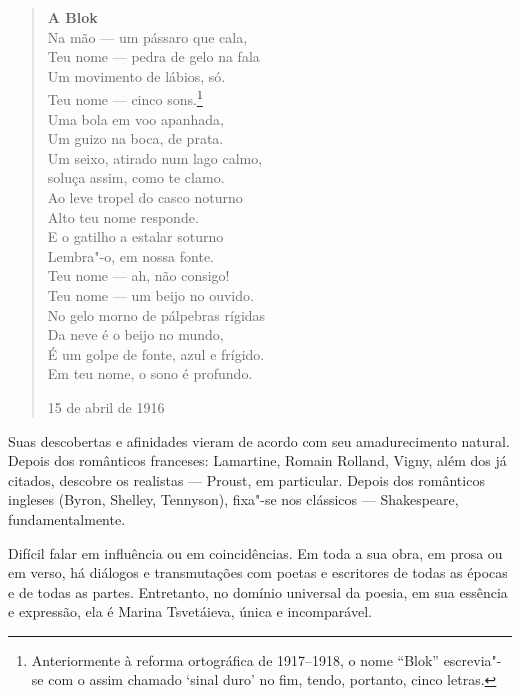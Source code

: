 \begin{verse}
\textbf{A Blok} \\[8pt]
Na mão --- um pássaro que cala, \\
Teu nome --- pedra de gelo na fala \\
Um movimento de lábios, só. \\
Teu nome --- cinco sons.\footnote{Anteriormente à reforma ortográfica de 1917--1918, o nome ``Blok'' escrevia"-se com o assim chamado `sinal duro' no fim, tendo, portanto, cinco letras.} \\
Uma bola em voo apanhada, \\
Um guizo na boca, de prata. \\[8pt]
Um seixo, atirado num lago calmo, \\
soluça assim, como te clamo. \\
Ao leve tropel do casco noturno \\
Alto teu nome responde. \\
E o gatilho a estalar soturno \\
Lembra"-o, em nossa fonte. \\[8pt]
Teu nome --- ah, não consigo! \\
Teu nome --- um beijo no ouvido. \\
No gelo morno de pálpebras rígidas \\
Da neve é o beijo no mundo, \\
É um golpe de fonte, azul e frígido. \\
Em teu nome, o sono é profundo. 

15 de abril de 1916

\end{verse}

Suas descobertas e afinidades vieram de acordo com seu
amadurecimento natural. Depois dos românticos franceses:
Lamartine, Romain Rolland, Vigny, além dos já citados, descobre
os realistas --- Proust, em particular. Depois dos românticos
ingleses (Byron, Shelley, Tennyson), fixa"-se nos clássicos ---
Shakespeare, fundamentalmente.

Difícil falar em influência ou em coincidências. Em toda a sua
obra, em prosa ou em verso, há diálogos e transmutações com poetas
e escritores de todas as épocas e de todas as partes. Entretanto,
no domínio universal da poesia, em sua essência e expressão, ela
é Marina Tsvetáieva, única e incomparável.

